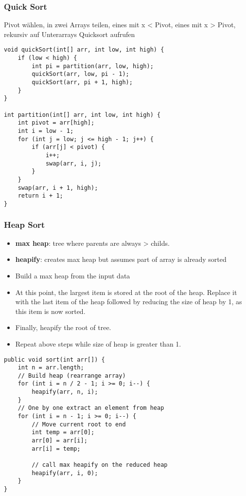 \begin{multicols*}{4}
		\subsubsection{Quick Sort}
		Pivot wählen, in zwei Arrays teilen, eines mit x < Pivot, eines mit x > Pivot, rekursiv auf Unterarrays Quicksort aufrufen
			\begin{lstlisting}
void quickSort(int[] arr, int low, int high) {
	if (low < high) {
		int pi = partition(arr, low, high);
		quickSort(arr, low, pi - 1);
		quickSort(arr, pi + 1, high);
	}
}
	
int partition(int[] arr, int low, int high) {
	int pivot = arr[high];
	int i = low - 1;
	for (int j = low; j <= high - 1; j++) {
		if (arr[j] < pivot) {
			i++;
			swap(arr, i, j);
		}
	}
	swap(arr, i + 1, high);
	return i + 1;
}
			\end{lstlisting}

		\subsubsection{Heap Sort}
			\begin{itemize}
				\item \textbf{max heap}: tree where parents are always > childs.
				\item \textbf{heapify}: creates max heap but assumes part of array is already sorted
				\item Build a max heap from the input data
				\item At this point, the largest item is stored at the root of the heap. Replace it with the last item of the heap followed by reducing the size of heap by 1, as this item is now sorted.
				\item Finally, heapify the root of tree.
				\item Repeat above steps while size of heap is greater than 1.			
			\end{itemize}
		
			\vspace{2pt}
			\begin{lstlisting}
public void sort(int arr[]) { 
	int n = arr.length; 
	// Build heap (rearrange array) 
	for (int i = n / 2 - 1; i >= 0; i--) {
		heapify(arr, n, i); 
	}
	// One by one extract an element from heap 
	for (int i = n - 1; i >= 0; i--) { 
		// Move current root to end 
		int temp = arr[0]; 
		arr[0] = arr[i]; 
		arr[i] = temp; 
		
		// call max heapify on the reduced heap 
		heapify(arr, i, 0); 
	} 
} 


\end{lstlisting}
\end{multicols*}
